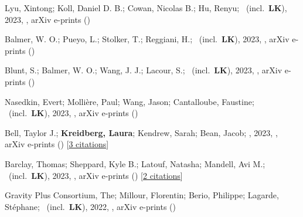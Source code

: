 \item[{\color{numcolor}\scriptsize19}] Lyu, Xintong; Koll, Daniel D. B.; Cowan, Nicolas B.; Hu, Renyu; \etal\ (incl.\ \textbf{LK}), 2023, , arXiv e-prints ()

\item[{\color{numcolor}\scriptsize18}] Balmer, W. O.; Pueyo, L.; Stolker, T.; Reggiani, H.; \etal\ (incl.\ \textbf{LK}), 2023, , arXiv e-prints ()

\item[{\color{numcolor}\scriptsize17}] Blunt, S.; Balmer, W. O.; Wang, J. J.; Lacour, S.; \etal\ (incl.\ \textbf{LK}), 2023, , arXiv e-prints ()

\item[{\color{numcolor}\scriptsize16}] Nasedkin, Evert; Molli{\`e}re, Paul; Wang, Jason; Cantalloube, Faustine; \etal\ (incl.\ \textbf{LK}), 2023, , arXiv e-prints ()

\item[{\color{numcolor}\scriptsize15}] Bell, Taylor J.; \textbf{Kreidberg, Laura}; Kendrew, Sarah; Bean, Jacob; \etal, 2023, , arXiv e-prints () [\href{https://ui.adsabs.harvard.edu/abs/2023arXiv230106350B}{3 citations}]

\item[{\color{numcolor}\scriptsize14}] Barclay, Thomas; Sheppard, Kyle B.; Latouf, Natasha; Mandell, Avi M.; \etal\ (incl.\ \textbf{LK}), 2023, , arXiv e-prints () [\href{https://ui.adsabs.harvard.edu/abs/2023arXiv230110866B}{2 citations}]

\item[{\color{numcolor}\scriptsize13}] Gravity Plus Consortium, The; Millour, Florentin; Berio, Philippe; Lagarde, St{\'e}phane; \etal\ (incl.\ \textbf{LK}), 2022, , arXiv e-prints ()

